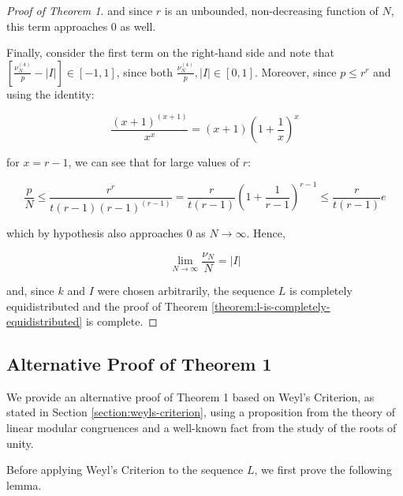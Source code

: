 \documentclass[11pt,a4paper]{tesis}
\theoremstyle{plain}
\theoremstyle{definition}
\begin{document}
\begin{proof}[Proof of Theorem 1]
  and since $r$ is an unbounded, non-decreasing function of $N$, this term approaches $0$ as well.

  Finally, consider the first term on the right-hand side and note that $\left[ \frac{\nu^{(4)}_N}{p} - |I| \right] \in [-1, 1]$, since both $\frac{\nu^{(4)}_N}{p}, |I| \in [0, 1]$. Moreover, since $p \le r^r$ and using the identity:

  \begin{equation*}
    \frac{(x + 1)^{(x + 1)}}{x^x} = (x + 1) \left(1 + \frac{1}{x} \right)^x
  \end{equation*}

  for $x = r - 1$, we can see that for large values of $r$:

  \begin{equation*}
    \frac{p}{N} \le \frac{r^r}{t(r - 1) (r - 1)^{(r - 1)}} = \frac{r}{t(r - 1)} \left( 1 + \frac{1}{r - 1} \right)^{r - 1} \le \frac{r}{t(r - 1)} e
  \end{equation*}

  which by hypothesis also approaches $0$ as $N \to \infty$. Hence,

  \begin{equation*}
    \lim_{N \to \infty} \frac{\nu_N}{N} = |I|
  \end{equation*}

  and, since $k$ and $I$ were chosen arbitrarily, the sequence $L$ is completely equidistributed and the proof of Theorem \ref{theorem:l-is-completely-equidistributed} is complete.

\end{proof}

\subsection{Alternative Proof of Theorem 1}

We provide an alternative proof of Theorem 1 based on Weyl's Criterion, as stated in Section \ref{section:weyls-criterion}, using a proposition from the theory of linear modular congruences and a well-known fact from the study of the roots of unity.

Before applying Weyl's Criterion to the sequence $L$, we first prove the following lemma.
\end{document}
